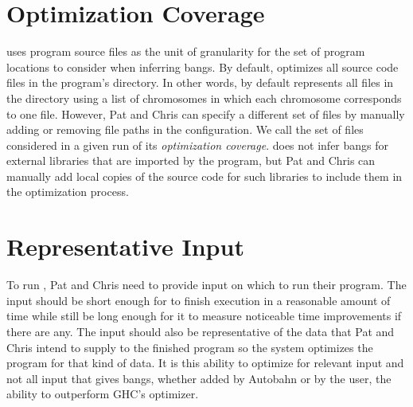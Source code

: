 \section{Optimization Coverage}

\Ao{} uses program source files as the unit of granularity for
the set of program locations to consider when inferring bangs. By
default, \Ao{} optimizes all source code files in the program's
directory. In other words, \Ao{} by default represents all files in the directory using a list of chromosomes in which each chromosome corresponds to one file. However, Pat and Chris can specify a different set of files by
manually adding or removing file paths in the \Ao{} configuration.
We call the set of files considered in a given run of \Ao{}
its \textit{optimization coverage}.
\Ao{} does not infer bangs for external libraries
that are imported by the program, but Pat and Chris can manually add local
copies of the source code for such libraries to include them in the optimization process.


\section{Representative Input}

To run \Ao{}, Pat and Chris need to provide input on which to run their
program. The input should be short enough for \Ao{} to finish
execution in a reasonable amount of time while still be long enough
for it to measure noticeable time improvements if there are
any. The input should also be representative of the data that Pat and Chris
intend to supply to the finished program so the system optimizes the
program for that kind of data. It is this ability to optimize for
relevant input and not all input that gives bangs, whether added by
Autobahn or by the user, the ability to outperform GHC's optimizer.
